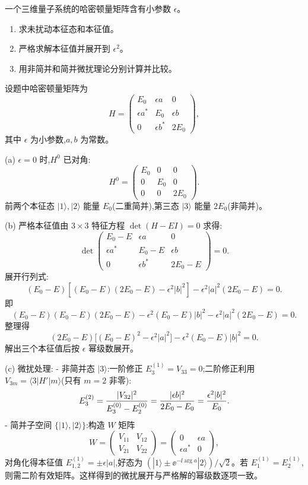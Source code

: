 \begin{question}
一个三维量子系统的哈密顿量矩阵含有小参数 $\epsilon$。
\begin{enumerate}
\item 求未扰动本征态和本征值。
\item 严格求解本征值并展开到 $\epsilon^2$。
\item 用非简并和简并微扰理论分别计算并比较。
\end{enumerate}
\begin{solution}
设题中哈密顿量矩阵为
\[
H=\begin{pmatrix}
E_0 & \epsilon a & 0\\
\epsilon a^* & E_0 & \epsilon b\\
0 & \epsilon b^* & 2E_0
\end{pmatrix},
\]
其中 $\epsilon$ 为小参数,$a,b$ 为常数。

(a) $\epsilon=0$ 时,$H^0$ 已对角:
\[
H^0=\begin{pmatrix}
E_0 & 0 & 0\\
0 & E_0 & 0\\
0 & 0 & 2E_0
\end{pmatrix}.
\]
前两个本征态 $|1\rangle,|2\rangle$ 能量 $E_0$(二重简并),第三态 $|3\rangle$ 能量 $2E_0$(非简并)。

(b) 严格本征值由 $3\times3$ 特征方程 $\det(H-EI)=0$ 求得:
\[
\det\begin{pmatrix}
E_0-E & \epsilon a & 0\\
\epsilon a^* & E_0-E & \epsilon b\\
0 & \epsilon b^* & 2E_0-E
\end{pmatrix}=0.
\]
展开行列式:
\[
(E_0-E)[(E_0-E)(2E_0-E)-\epsilon^2|b|^2]-\epsilon^2|a|^2(2E_0-E)=0.
\]
即
\[
(E_0-E)(E_0-E)(2E_0-E)-\epsilon^2(E_0-E)|b|^2-\epsilon^2|a|^2(2E_0-E)=0.
\]
整理得
\[
(2E_0-E)\bigl[(E_0-E)^2-\epsilon^2|a|^2\bigr]-\epsilon^2(E_0-E)|b|^2=0.
\]
解出三个本征值后按 $\epsilon$ 幂级数展开。

(c) 微扰处理:
- 非简并态 $|3\rangle$:一阶修正 $E_3^{(1)}=V_{33}=0$;二阶修正利用 $V_{3m}=\langle3|H'|m\rangle$(只有 $m=2$ 非零):
\[
E_3^{(2)}={|V_{32}|^2\over E_3^{(0)}-E_2^{(0)}}
={|\epsilon b|^2\over 2E_0-E_0}={\epsilon^2|b|^2\over E_0}.
\]
- 简并子空间 $\{|1\rangle,|2\rangle\}$:构造 $W$ 矩阵
\[
W=\begin{pmatrix}
V_{11} & V_{12}\\
V_{21} & V_{22}
\end{pmatrix}
=\begin{pmatrix}
0 & \epsilon a\\
\epsilon a^* & 0
\end{pmatrix},
\]
对角化得本征值 $E_{1,2}^{(1)}=\pm\epsilon|a|$,好态为 $(|1\rangle\pm \ee^{-\ii\arg a}|2\rangle)/\sqrt2$。若 $E_1^{(1)}=E_2^{(1)}$,则需二阶有效矩阵。这样得到的微扰展开与严格解的幂级数逐项一致。
\end{solution}
\end{question}

